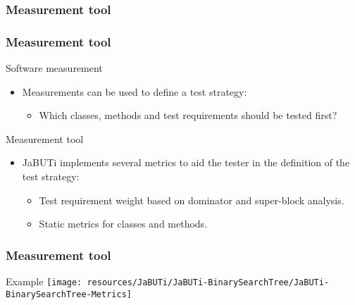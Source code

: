 \begin{frame}[c,parent={cmap:jabuti-software-testing},hasnext=true,hasprev=false]
\label{cmap:metrics-tool}
\label{cmap:measurement-tool}
\label{cmap:software-measurement-tool}
\label{cmap:jabuti-measurement-tool}
\frametitle{Measurement tool}

\end{frame}



\begin{frame}[parent={cmap:jabuti-measurement-tool},hasnext=true,hasprev=true]
\frametitle{Measurement tool}
\label{concept:measurement-tool}
\label{concept:metric-tool}
\label{concept:software-measurement-tool}
\label{concept:jabuti-measurement-tool}

\begin{block:concept}{Software measurement}
\begin{itemize}
	\item<1-> Measurements can be used to define a test strategy:
	\begin{itemize}
		\item Which classes, methods and test requirements should be tested
		first?
	\end{itemize}
\end{itemize}
\end{block:concept}

\begin{block:concept}{Measurement tool}
\begin{itemize}
	\item<2-> JaBUTi implements several metrics to aid the tester in the
	definition of the test strategy:
	\begin{itemize}
		\item Test requirement weight based on dominator and super-block
		analysis.

		\item Static metrics for classes and methods.
	\end{itemize}
\end{itemize}
\end{block:concept}
\end{frame}


\begin{frame}
\frametitle{Measurement tool}

\begin{block}{Example}
\texttt{[image: resources/JaBUTi/JaBUTi-BinarySearchTree/JaBUTi-BinarySearchTree-Metrics]}
\end{block}
\end{frame}
